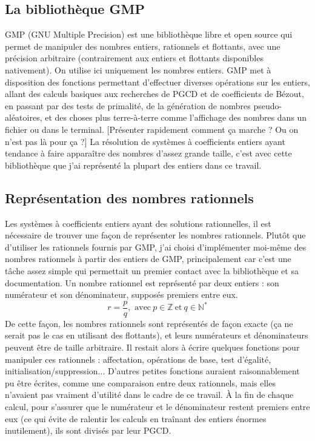 \documentclass[french]{article}
\begin{document}
\subsection{La bibliothèque GMP}
GMP (GNU Multiple Precision) est une bibliothèque libre et open source qui permet de manipuler des nombres entiers, rationnels et flottants, avec une précision arbitraire (contrairement aux entiers et flottants disponibles nativement). On utilise ici uniquement les nombres entiers. GMP met à disposition des fonctions permettant d'effectuer diverses opérations sur les entiers, allant des calculs basiques aux recherches de PGCD et de coefficients de Bézout, en passant par des tests de primalité, de la génération de nombres pseudo-aléatoires, et des choses plus terre-à-terre comme l'affichage des nombres dans un fichier ou dans le terminal. [Présenter rapidement comment ça marche ? Ou on n'est pas là pour ça ?] La résolution de systèmes à coefficients entiers ayant tendance à faire apparaître des nombres d'assez grande taille, c'est avec cette bibliothèque que j'ai représenté la plupart des entiers dans ce travail.
\subsection{Représentation des nombres rationnels}
Les systèmes à coefficients entiers ayant des solutions rationnelles, il est nécessaire de trouver une façon de représenter les nombres rationnels. Plutôt que d'utiliser les rationnels fournis par GMP, j'ai choisi d'implémenter moi-même des nombres rationnels à partir des entiers de GMP, principalement car c'est une tâche assez simple qui permettait un premier contact avec la bibliothèque et sa documentation.
Un nombre rationnel est représenté par deux entiers : son numérateur et son dénominateur, supposés premiers entre eux. 
$$r = \frac{p}{q}, \mbox{ avec} \ p \in \mathbb{Z}\ \mbox{et} \ q \in \mathbb{N}^*$$
De cette façon, les nombres rationnels sont représentés de façon exacte (ça ne serait pas le cas en utilisant des flottants), et leurs numérateurs et dénominateurs peuvent être de taille arbitraire.
Il restait alors à écrire quelques fonctions pour manipuler ces rationnels : affectation, opérations de base, test d'égalité, initialisation/suppression... D'autres petites fonctions auraient raisonnablement pu être écrites, comme une comparaison entre deux rationnels, mais elles n'avaient pas vraiment d'utilité dans le cadre de ce travail.
À la fin de chaque calcul, pour s'assurer que le numérateur et le dénominateur restent premiers entre eux (ce qui évite de ralentir les calculs en traînant des entiers énormes inutilement), ils sont divisés par leur PGCD.
\end{document}
